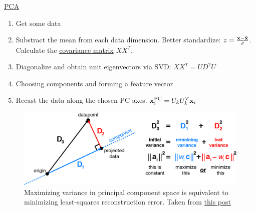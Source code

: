 \documentclass{beamer}
\begin{document}
\begin{frame}{\href{https://builtin.com/data-science/step-step-explanation-principal-component-analysis}{PCA}}
    \begin{enumerate}
        \item Get some data
        \item Substract the mean from each data dimension. Better standardize: $z=\frac{\textbf{x}-\bar{\textbf{x}}}{\sigma}$. Calculate the \href{https://datascienceplus.com/understanding-the-covariance-matrix/}{covariance matrix} $X X^T$.
        \item Diagonalize and obtain unit eigenvectors via SVD: $X X^T=U D^2 U$
        \item Choosing components and forming a feature vector 
        \item Recast the data along the chosen PC axes. $\textbf{x}_i^{\mathrm{PC}}=U_k U_k^T \textbf{x}_i$
    \end{enumerate}
    \begin{figure}
        \includegraphics[width=0.7\linewidth]{projection_intuition}
        \caption{Maximizing variance in principal component space is equivalent to minimizing least-squares reconstruction error. Taken from \href{http://alexhwilliams.info/itsneuronalblog/2016/03/27/pca/}{this post}}
    \end{figure}
\end{frame}
\end{document}
